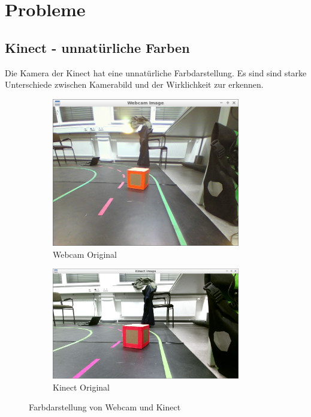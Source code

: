 \section{Probleme}
\label{cha:Probleme}

\subsection{Kinect - unnatürliche Farben}
\label{sec:farben}
Die Kamera der Kinect hat eine unnatürliche Farbdarstellung.
Es sind sind starke Unterschiede zwischen Kamerabild und der Wirklichkeit zur erkennen.

\begin{figure}[ht]
	\centering
	\begin{subfigure}{0.45\textwidth}
		\centering
		\includegraphics[width=0.9\textwidth]{images/Webcam_RAW.png}
		\caption{Webcam Original}
	\end{subfigure}
	\begin{subfigure}{0.45\textwidth}
		\centering
		\includegraphics[width=0.9\textwidth]{images/Kinect_qHD_RAW.png}
		\caption{Kinect Original}
	\end{subfigure}
	\caption{Farbdarstellung von Webcam und Kinect}
\end{figure}

